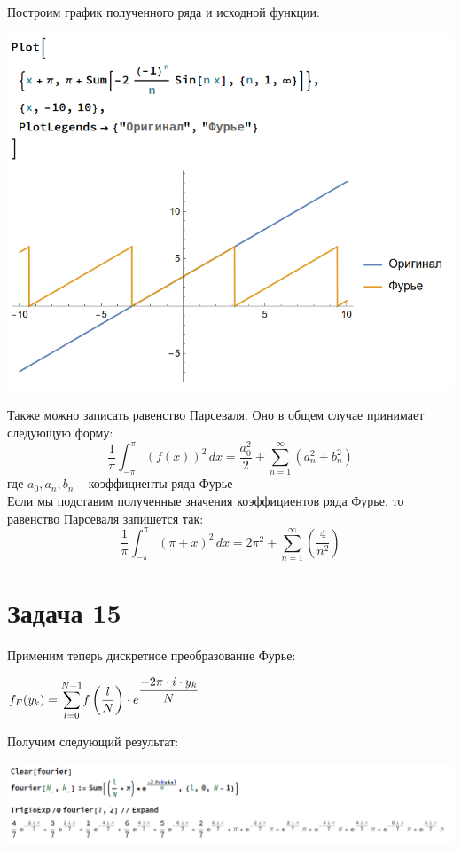 \documentclass[14pt,fleqn]{extarticle}
\begin{document}
	Построим график полученного ряда и исходной функции:
	\begin{center}
		\includegraphics[scale=0.5]{plot}
	\end{center}
	Также можно записать равенство Парсеваля. Оно в общем случае принимает следующую форму:
	\[ \dfrac{1}{\pi} \int_{-\pi}^{\pi} (f(x))^2 \,dx = \dfrac{a_0^2}{2}+\sum_{n=1}^{\infty}(a_n^2+b_n^2) \]
	где $a_0, a_n, b_n$ -- коэффициенты ряда Фурье\\
	Если мы подставим полученные значения коэффициентов ряда Фурье, то равенство Парсеваля запишется так:
	\[ \dfrac{1}{\pi} \int_{-\pi}^{\pi} (\pi+x)^2 \,dx = 2 \pi^2+\sum_{n=1}^{\infty}\left(\dfrac{4}{n^2}\right) \]
	\newpage
	\section*{Задача 15}
	Применим теперь дискретное преобразование Фурье:\\
	\begin{center}
		$f_F(y_k) = \smashoperator[r]{\sum_{l=0}^{N-1}} f\left(\dfrac{l}{N}\right) \cdot e^{\dfrac{-2\pi \cdot i \cdot y_k}{N}}$
	\end{center}
	Получим следующий результат:
	\begin{center}
		\includegraphics[scale=0.5]{fourier}
	\end{center}
\end{document}
